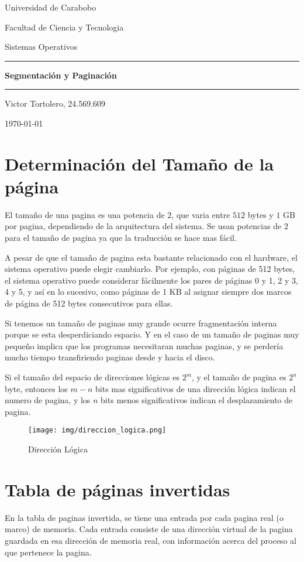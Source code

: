 \documentclass{article}
\begin{document}
\centerline{Universidad de Carabobo}
\centerline{Facultad de Ciencia y Tecnologia}
\centerline{Sistemas Operativos}
\vspace{7cm}
\begin{centering}
	\hrule 	\vspace{0.4cm}
	{ \Huge \bfseries Segmentación y Paginación \\[0.4cm] }
	\hrule \vfill
\end{centering}
\vfill
\centerline{Victor Tortolero, 24.569.609}
\centerline{\today}
\newpage

{\centering \section*{Determinación del Tamaño de la página}}
El tamaño de una pagina es una potencia de $2$, que varia entre $512$ bytes y $1$ GB por pagina, dependiendo de la arquitectura del sistema. Se usan potencias de $2$ para el tamaño de pagina ya que la traducción se hace mas fácil.

A pesar de que el tamaño de pagina esta bastante relacionado con el hardware, el sistema operativo puede elegir cambiarlo. Por ejemplo, con páginas de 512 bytes, el sistema operativo puede considerar fácilmente los pares de páginas 0 y 1, 2 y 3, 4 y 5, y así en lo sucesivo, como páginas de 1 KB al asignar siempre dos marcos de página de 512 bytes consecutivos para ellas.

Si tenemos un tamaño de paginas muy grande ocurre fragmentación interna porque se esta desperdiciando espacio. Y en el caso de un tamaño de paginas muy pequeño implica que los programas necesitaran muchas paginas, y se perdería mucho tiempo transfiriendo paginas desde y hacia el disco.

Si el tamaño del espacio de direcciones lógicas es $2^m$, y el tamaño de pagina es $2^n$ byte, entonces los $m - n$ bits mas significativos de una dirección lógica indican el numero de pagina, y los $n$ bits menos significativos indican el desplazamiento de pagina.

\begin{figure}[H]
	\centering
	\texttt{[image: img/direccion\_logica.png]}
	\caption{Dirección Lógica}
\end{figure}


{\centering \section*{Tabla de páginas invertidas}}
En la tabla de paginas invertida, se tiene una entrada por cada pagina real (o marco) de memoria. Cada entrada consiste de una dirección virtual de la pagina guardada en esa dirección de memoria real, con información acerca del proceso al que pertenece la pagina.
\end{document}
